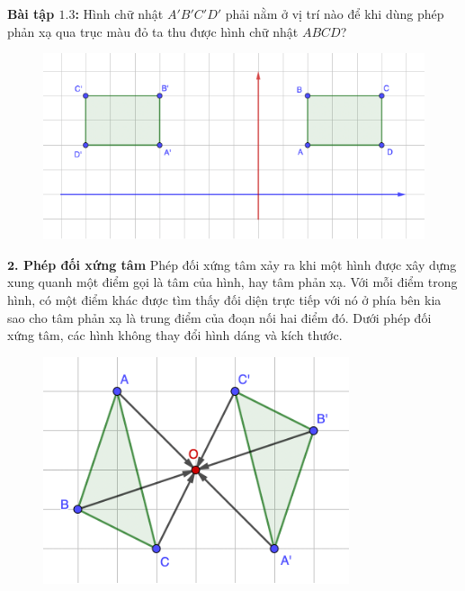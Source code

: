 \begin{multicols}{2}
	\textbf{\color{toancuabi}Bài tập $\pmb{1.3}$:} Hình chữ nhật $A'B'C'D'$ phải nằm ở vị trí nào để khi dùng phép phản xạ qua trục màu đỏ ta thu được hình chữ nhật $ABCD$?
	\begin{figure}[H]
		\vspace*{-5pt}
		\centering
		\captionsetup{labelformat= empty, justification=centering}
		\includegraphics[width= 1\linewidth]{Picture8}
		\vspace*{-10pt}
	\end{figure}
	\textbf{\color{toancuabi}$\pmb2$. Phép đối xứng tâm}
	\vskip 0.1cm
	Phép đối xứng tâm xảy ra khi một hình được xây dựng xung quanh một điểm gọi là tâm của hình, hay tâm phản xạ. Với mỗi điểm trong hình, có một điểm khác được tìm thấy đối diện trực tiếp với nó ở phía bên kia sao cho tâm phản xạ là trung điểm của đoạn nối hai điểm đó. Dưới phép đối xứng tâm, các hình không thay đổi hình dáng và kích thước. 
	\begin{figure}[H]
		\vspace*{-5pt}
		\centering
		\captionsetup{labelformat= empty, justification=centering}
		\includegraphics[width= 0.75\linewidth]{Picture9}
		\vspace*{-10pt}
	\end{figure}

\end{multicols}
